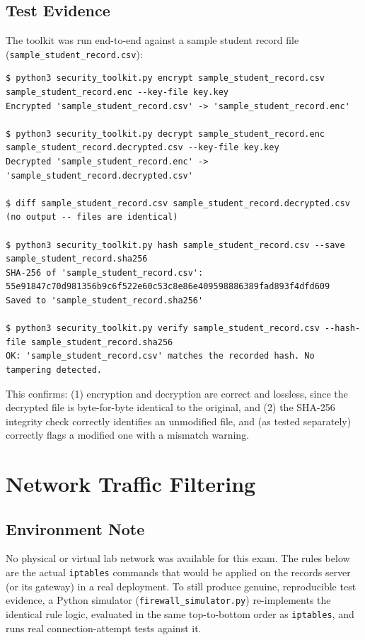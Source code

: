 \documentclass[11pt,a4paper]{article}
\begin{document}
\subsection{Test Evidence}

The toolkit was run end-to-end against a sample student record file
(\texttt{sample\_student\_record.csv}):

\begin{lstlisting}
$ python3 security_toolkit.py encrypt sample_student_record.csv sample_student_record.enc --key-file key.key
Encrypted 'sample_student_record.csv' -> 'sample_student_record.enc'

$ python3 security_toolkit.py decrypt sample_student_record.enc sample_student_record.decrypted.csv --key-file key.key
Decrypted 'sample_student_record.enc' -> 'sample_student_record.decrypted.csv'

$ diff sample_student_record.csv sample_student_record.decrypted.csv
(no output -- files are identical)

$ python3 security_toolkit.py hash sample_student_record.csv --save sample_student_record.sha256
SHA-256 of 'sample_student_record.csv': 55e91847c70d981356b9c6f522e60c53c8e86e409598886389fad893f4dfd609
Saved to 'sample_student_record.sha256'

$ python3 security_toolkit.py verify sample_student_record.csv --hash-file sample_student_record.sha256
OK: 'sample_student_record.csv' matches the recorded hash. No tampering detected.
\end{lstlisting}

This confirms: (1) encryption and decryption are correct and lossless, since
the decrypted file is byte-for-byte identical to the original, and (2) the
SHA-256 integrity check correctly identifies an unmodified file, and (as
tested separately) correctly flags a modified one with a mismatch warning.

\section{Network Traffic Filtering}

\subsection{Environment Note}

No physical or virtual lab network was available for this exam. The rules
below are the actual \texttt{iptables} commands that would be applied on
the records server (or its gateway) in a real deployment. To still produce
genuine, reproducible test evidence, a Python simulator
(\texttt{firewall\_simulator.py}) re-implements the identical rule logic,
evaluated in the same top-to-bottom order as \texttt{iptables}, and runs
real connection-attempt tests against it.
\end{document}
